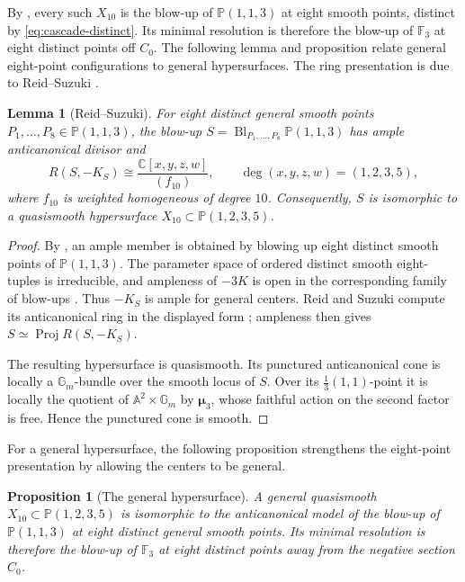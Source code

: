 \documentclass[11pt]{article}
\theoremstyle{plain}
\newtheorem{proposition}[proposition]{Proposition}
\newtheorem{lemma}[lemma]{Lemma}
\theoremstyle{definition}
\theoremstyle{remark}
\newcommand{\A}{\mathbb A}
\newcommand{\Pp}{\mathbb P}
\newcommand{\F}{\mathbb F}
\newcommand{\C}{\mathbb C}
\newcommand{\Bl}{\operatorname{Bl}}
\newcommand{\muthree}{\boldsymbol{\mu}_3}
\begin{document}
By \cite[Corollary~8(1)]{Corti2016}, every such \(X_{10}\) is
the blow-up of \(\Pp(1,1,3)\) at eight smooth points, distinct by
\eqref{eq:cascade-distinct}. Its minimal resolution is therefore
the blow-up of \(\F_3\) at eight distinct points off \(C_0\).
The following lemma and proposition relate general eight-point
configurations to general hypersurfaces. The ring presentation is due to
Reid--Suzuki \cite[Section~1 and Table~1.1]{ReidSuzuki2004}.

\begin{lemma}[Reid--Suzuki]
\label{prop:reid-suzuki-X10}
For eight distinct general smooth points
\(P_1,\dots,P_8\in\Pp(1,1,3)\), the blow-up
\(S=\Bl_{P_1,\ldots,P_8}\Pp(1,1,3)\) has ample anticanonical divisor and
\[
R(S,-K_S)\cong
\frac{\C[x,y,z,w]}{(f_{10})},
\qquad
\deg(x,y,z,w)=(1,2,3,5),
\]
where \(f_{10}\) is weighted homogeneous of degree \(10\). Consequently,
\(S\) is isomorphic to a quasismooth hypersurface
\(X_{10}\subset\Pp(1,2,3,5)\).
\end{lemma}

\begin{proof}
By \cite[Corollary~8(1)]{Corti2016}, an ample member is obtained by blowing
up eight distinct smooth points of \(\Pp(1,1,3)\). The parameter space of
ordered distinct smooth eight-tuples is irreducible, and ampleness of
\(-3K\) is open in the corresponding family of blow-ups
\cite[Tag~0D2S]{StacksProject}. Thus \(-K_S\) is ample for general
centers. Reid and Suzuki compute its anticanonical ring in the displayed
form \cite[Section~1 and Table~1.1]{ReidSuzuki2004}; ampleness then gives
\(S\simeq\operatorname{Proj}R(S,-K_S)\).

The resulting hypersurface is quasismooth. Its punctured anticanonical
cone is locally a \(\mathbb G_m\)-bundle over the smooth locus of \(S\).
Over its \(\frac13(1,1)\)-point it is locally the quotient of
\(\A^2\times\mathbb G_m\) by \(\muthree\), whose faithful action on the
second factor is free. Hence the punctured cone is smooth.
\end{proof}

For a general hypersurface, the following proposition strengthens the
eight-point presentation by allowing the centers to be general.

\begin{proposition}[The general hypersurface]
\label{prop:general-X10}
A general quasismooth
\(X_{10}\subset\Pp(1,2,3,5)\) is isomorphic to the anticanonical model of
the blow-up of \(\Pp(1,1,3)\) at eight distinct general smooth points.
Its minimal resolution is therefore the blow-up of \(\F_3\) at eight
distinct points away from the negative section \(C_0\).
\end{proposition}
\end{document}
